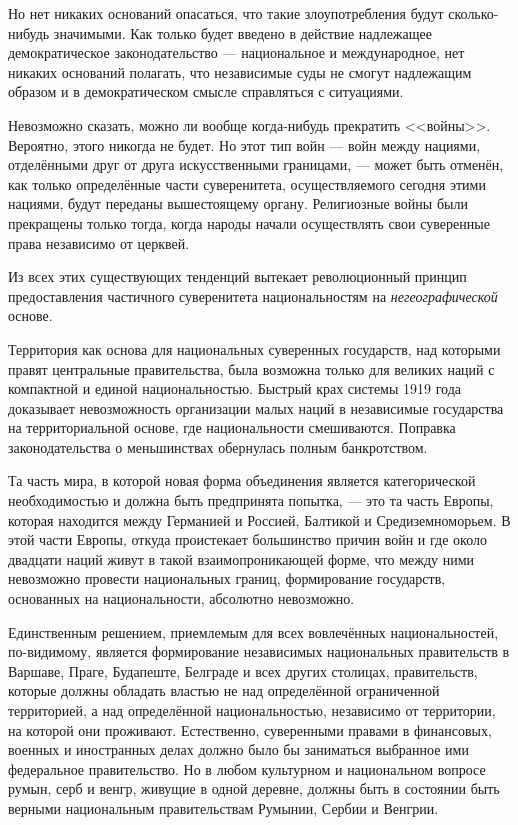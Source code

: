 Но нет никаких оснований опасаться, что такие злоупотребления будут сколько-нибудь значимыми. Как только будет введено в действие надлежащее демократическое законодательство — национальное и международное, нет никаких оснований полагать, что независимые суды не смогут надлежащим образом и в демократическом смысле справляться с ситуациями.
 
Невозможно сказать, можно ли вообще когда-нибудь прекратить <<войны>>. Вероятно, этого никогда не будет. Но этот тип войн — войн между нациями, отделёнными друг от друга искусственными границами, — может быть отменён, как только определённые части суверенитета, осуществляемого сегодня этими нациями, будут переданы вышестоящему органу. Религиозные войны были прекращены только тогда, когда народы начали осуществлять свои суверенные права независимо от церквей.

Из всех этих существующих тенденций вытекает революционный принцип предоставления частичного суверенитета национальностям на \textit{негеографической} основе.
 
Территория как основа для национальных суверенных государств, над которыми правят центральные правительства, была возможна только для великих наций с компактной и единой национальностью. Быстрый крах системы 1919 года доказывает невозможность организации малых наций в независимые государства на территориальной основе, где национальности смешиваются. Поправка законодательства о меньшинствах обернулась полным банкротством.

Та часть мира, в которой новая форма объединения является категорической необходимостью и должна быть предпринята попытка, — это та часть Европы, которая находится между Германией и Россией, Балтикой и Средиземноморьем. В этой части Европы, откуда проистекает большинство причин войн и где около двадцати наций живут в такой взаимопроникающей форме, что между ними невозможно провести национальных границ, формирование государств, основанных на национальности, абсолютно невозможно.
 
Единственным решением, приемлемым для всех вовлечённых национальностей, по-видимому, является формирование независимых национальных правительств в Варшаве, Праге, Будапеште, Белграде и всех других столицах, правительств, которые должны обладать властью не над определённой ограниченной территорией, а над определённой национальностью, независимо от территории, на которой они проживают. Естественно, суверенными правами в финансовых, военных и иностранных делах должно было бы заниматься выбранное ими федеральное правительство. Но в любом культурном и национальном вопросе румын, серб и венгр, живущие в одной деревне, должны быть в состоянии быть верными национальным правительствам Румынии, Сербии и Венгрии.

